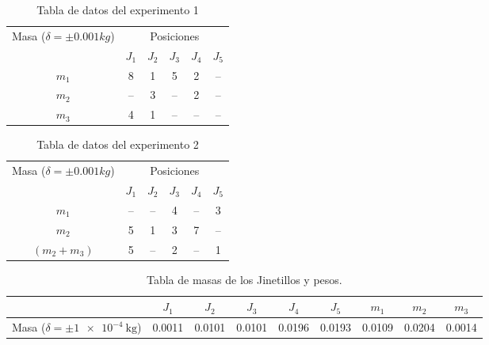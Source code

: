 \documentclass[../main.tex]{subfiles}
\begin{document}
\begin{table}[H]
    \centering
    \begin{tabular}{cccccc}
        \toprule
        \multirow{2}{*}{Masa ($\delta = \pm 0.001kg$)}
         & \multicolumn{5}{c}{Posiciones}\\
        \cmidrule{2-6}
              &  $J_1$  &  $J_2$  &  $J_3$  &  $J_4$  &  $J_5$ \\
        \midrule
        $m_1$ &  8   &  1   &  5   &  2   &  -- \\
        $m_2$ &  --  &  3   &  --  &  2   &  -- \\
        $m_3$ &  4   &  1   &  --  &  --  &  -- \\
        \bottomrule
    \end{tabular}
    \caption{Tabla de datos del experimento 1}
    \label{ref:table1}
\end{table}

\begin{table}[H]
    \centering
    \begin{tabular}{cccccc}
        \toprule
        \multirow{2}{*}{Masa ($\delta = \pm 0.001kg$)}
         & \multicolumn{5}{c}{Posiciones}\\
        \cmidrule{2-6}
             &  $J_1$  &  $J_2$  &  $J_3$  &  $J_4$  &  $J_5$ \\
        \midrule
        $m_1$ &  --  &  --   &  4  &  --  &  3 \\
        $m_2$ &  5   &  1    &  3  &  7   &  -- \\
        $(m_2 + m_3)$  &  5   &  --  &  2  &  --  &  1 \\
        \bottomrule
    \end{tabular}
    \caption{Tabla de datos del experimento 2}
    \label{ref:table2}
\end{table}

\begin{table}[H]
    \centering
    \begin{tabular}{ccccccccc}
    \cmidrule{2-9}
                                      &  $J_1$   &  $J_2$    &  $J_3$    &  $J_4$   &  $J_5$  & $m_1 $  & $m_2 $  & $m_3$\\
        \midrule
      Masa ($\delta = \pm \qty{1e-4}{\kilo\gram}$) &  0.0011  &  0.0101  &  0.0101  &  0.0196 & 0.0193 & 0.0109 & 0.0204 & 0.0014 \\
    \bottomrule
    \end{tabular}
    \label{ref:table3}
    \caption{Tabla de masas de los Jinetillos y pesos.}
\end{table}
\end{document}
